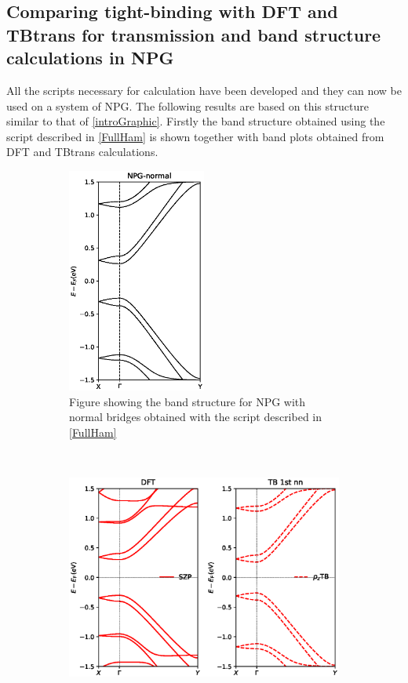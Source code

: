 \subsection{Comparing tight-binding with DFT and TBtrans for transmission and band structure calculations in NPG}\label{CompTB}
All the scripts necessary for calculation have been developed and they can now be used on a system of NPG.
The following results are based on this structure similar to that of \cref{introGraphic}. Firstly the band structure obtained using the script described in \cref{FullHam} is shown together with band plots obtained from DFT and TBtrans calculations.
\begin{figure}[H]
	\centering
	\begin{subfigure}[t]{0.45\textwidth}
		\centering
		\includegraphics[width=0.5\textwidth]{Figures/NPG-normalBandstructures.eps}
		\caption{Figure showing the band structure for NPG with normal bridges obtained with the script described in \cref{FullHam}}
		\label{bsscript}
	\end{subfigure}
	~  %
	\begin{subfigure}[t]{0.45\textwidth}
		\centering
		\includegraphics[width=\textwidth]{Figures/bands.eps}

\end{subfigure}
\end{figure}

